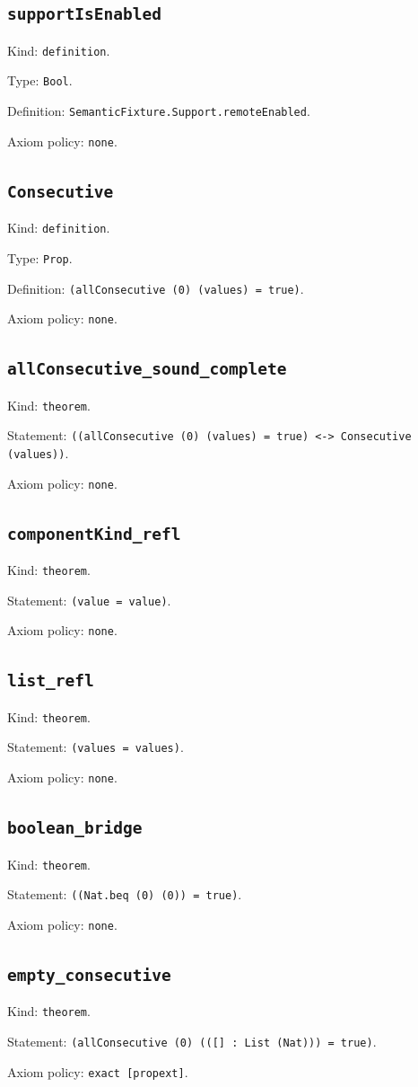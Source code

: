 \documentclass[11pt]{article}
\begin{document}
\subsection*{\texttt{supportIsEnabled}}
\noindent Kind: \texttt{definition}.\par
\noindent Type: \texttt{Bool}.\par
\noindent Definition: \texttt{SemanticFixture.Support.remoteEnabled}.\par
\noindent Axiom policy: \texttt{none}.\par
\subsection*{\texttt{Consecutive}}
\noindent Kind: \texttt{definition}.\par
\noindent Type: \texttt{Prop}.\par
\noindent Definition: \texttt{(allConsecutive (0) (values) = true)}.\par
\noindent Axiom policy: \texttt{none}.\par
\subsection*{\texttt{allConsecutive\_sound\_complete}}
\noindent Kind: \texttt{theorem}.\par
\noindent Statement: \texttt{((allConsecutive (0) (values) = true) <-> Consecutive (values))}.\par
\noindent Axiom policy: \texttt{none}.\par
\subsection*{\texttt{componentKind\_refl}}
\noindent Kind: \texttt{theorem}.\par
\noindent Statement: \texttt{(value = value)}.\par
\noindent Axiom policy: \texttt{none}.\par
\subsection*{\texttt{list\_refl}}
\noindent Kind: \texttt{theorem}.\par
\noindent Statement: \texttt{(values = values)}.\par
\noindent Axiom policy: \texttt{none}.\par
\subsection*{\texttt{boolean\_bridge}}
\noindent Kind: \texttt{theorem}.\par
\noindent Statement: \texttt{((Nat.beq (0) (0)) = true)}.\par
\noindent Axiom policy: \texttt{none}.\par
\subsection*{\texttt{empty\_consecutive}}
\noindent Kind: \texttt{theorem}.\par
\noindent Statement: \texttt{(allConsecutive (0) (([] : List (Nat))) = true)}.\par
\noindent Axiom policy: \texttt{exact [propext]}.\par
\end{document}
